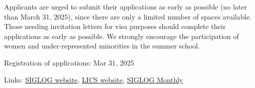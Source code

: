 \documentclass[prodmode,acmtecs]{acmsmall} %
\begin{document}
\begin{itemize}
  Applicants are urged to submit their applications as early as possible (no later than March 31, 2025), since there are only a limited number of spaces available. Those needing invitation letters for visa purposes should complete their applications as early as possible.  We strongly encourage the participation of women and under-represented minorities in the summer school. 
 
Registration of applications: Mar 31, 2025 
 
\end{itemize}


\bigskip Links: \href{http://siglog.org/}{SIGLOG website}, \href{https://lics.siglog.org}{LICS website}, \href{https://lics.siglog.org/newsletters/}{SIGLOG Monthly}
\end{document}
